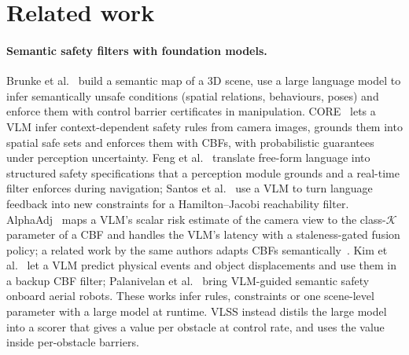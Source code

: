 \documentclass[10pt,a4paper]{article}
\begin{document}
\section{Related work}\label{sec:related}

\paragraph{Semantic safety filters with foundation models.} Brunke et al.~\cite{brunke2025semantic} build a semantic map of a 3D
scene, use a large language model to infer semantically unsafe conditions (spatial relations, behaviours, poses) and enforce them
with control barrier certificates in manipulation. CORE~\cite{ravichandran2026core} lets a VLM infer context-dependent safety rules
from camera images, grounds them into spatial safe sets and enforces them with CBFs, with probabilistic guarantees under
perception uncertainty. Feng et al.~\cite{feng2025words} translate free-form language into structured safety specifications that a
perception module grounds and a real-time filter enforces during navigation; Santos et al.~\cite{santos2025updating} use a VLM to
turn language feedback into new constraints for a Hamilton--Jacobi reachability filter. AlphaAdj~\cite{chen2026alphaadj} maps a
VLM's scalar risk estimate of the camera view to the class-$\mathcal K$ parameter of a CBF and handles the VLM's latency with a
staleness-gated fusion policy; a related work by the same authors adapts CBFs semantically~\cite{chen2026semanticcbf}. Kim et
al.~\cite{kim2026predictive} let a VLM predict physical events and object displacements and use them in a backup CBF filter;
Palanivelan et al.~\cite{palanivelan_aerial} bring VLM-guided semantic safety onboard aerial robots. These works infer rules,
constraints or one scene-level parameter with a large model at runtime. VLSS instead distils the large model into a scorer that
gives a value per obstacle at control rate, and uses the value inside per-obstacle barriers.
\end{document}
